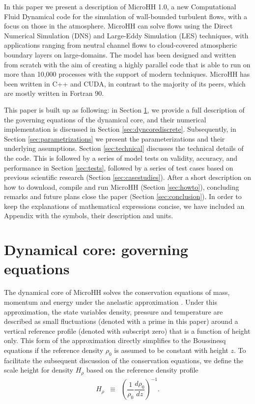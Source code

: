 \documentclass[gmd]{copernicus}
\begin{document}
\introduction  %
In this paper we present a description of MicroHH 1.0, a new Computational Fluid Dynamical code for the simulation of wall-bounded turbulent flows, with a focus on those in the atmosphere. MicroHH can solve flows using the Direct Numerical Simulation (DNS) and Large-Eddy Simulation (LES) techniques, with applications ranging from neutral channel flows to cloud-covered atmospheric boundary layers on large-domains. The model has been designed and written from scratch with the aim of creating a highly parallel code that is able to run on more than 10,000 processes with the support of modern techniques. MicroHH has been written in C++ and CUDA, in contrast to the majority of its peers, which are mostly written in Fortran 90.

This paper is built up as following: in Section \ref{sec:dyncore}, we provide a full description of the governing equations of the dynamical core, and their numerical implementation is discussed in Section \ref{sec:dyncorediscrete}. Subsequently, in Section \ref{sec:parametrizations} we present the parameterizations and their underlying assumptions. Section \ref{sec:technical} discusses the technical details of the code. This is followed by a series of model tests on validity, accuracy, and performance in Section \ref{sec:tests}, followed by a series of test cases based on previous scientific research (Section \ref{sec:casestudies}). After a short description on how to download, compile and run MicroHH (Section \ref{sec:howto}), concluding remarks and future plans close the paper (Section \ref{sec:conclusion}). In order to keep the explanations of mathematical expressions concise, we have included an Appendix with the symbols, their description and  units.

\section{Dynamical core: governing equations}\label{sec:dyncore}
The dynamical core of MicroHH solves the conservation equations of mass, momentum and energy under the anelastic approximation \citep{Bannon1996}. Under this approximation, the state variables density, pressure and temperature are described as small fluctuations (denoted with a prime in this paper) around a vertical reference profile (denoted with subscript zero) that is a function of height only. This form of the approximation directly simplifies to the Boussinesq equations if the reference density $\rho_0$ is assumed to be constant with height $z$. To facilitate the subsequent discussion of the conservation equations, we define the scale height for density $H_\rho$ based on the reference density profile
\begin{eqnarray}
H_{\rho} & \equiv & \left( \dfrac{1}{\rho_0} \dfrac{d \rho_0}{dz} \right)^{-1}.
\end{eqnarray}
\end{document}
